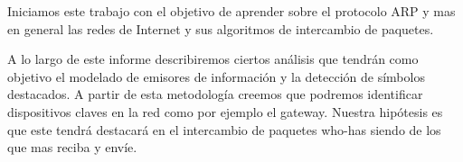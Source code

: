 
Iniciamos este trabajo con el objetivo de aprender sobre el protocolo ARP y mas en general las redes de Internet y sus algoritmos de intercambio de paquetes.

A lo largo de este informe describiremos ciertos análisis que tendrán como objetivo el modelado de emisores de información y la detección de símbolos destacados. A partir de esta metodología creemos que podremos identificar dispositivos claves en la red como por ejemplo el gateway. Nuestra hipótesis es que este tendrá destacará en el intercambio de paquetes who-has siendo de los que mas reciba y envíe.